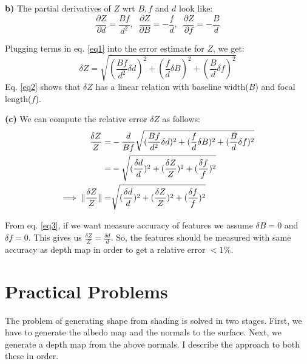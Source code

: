 \documentclass[11pt]{article}
\begin{document}
\textbf{b)} The partial derivatives of $Z$ wrt $B,f$ and $d$ look like:
\vspace{-10pt}
\begin{equation}
\frac{\partial Z}{\partial d} = \frac{Bf}{d^2},  \; \; \frac{\partial Z}{\partial B} = -\frac{f}{d}, \; \; \frac{\partial Z}{\partial f} = -\frac{B}{d} 
\label{eq1}
\end{equation}

Plugging terms in eq. \ref{eq1} into the error estimate for $Z$, we get:
\vspace{-5pt}
\begin{equation}
\delta Z = \sqrt{ (\frac{Bf}{d^2} \delta d)^2 + (\frac{f}{d} \delta B)^2 + (\frac{B}{d} \delta f)^2}
\label{eq2}
\end{equation}
\vspace{-5pt}
Eq. \ref{eq2} shows that $\delta Z$ has a linear relation with baseline width($B$) and focal length($f$).

\textbf{(c)} We can compute the relative error $\delta Z$ as follows:
\vspace{-10pt}
\begin{align}
\frac{\delta Z}{Z} =& -\frac{d}{Bf}  \sqrt{ (\frac{Bf}{d^2} \delta d)^2 + (\frac{f}{d} \delta B)^2 + (\frac{B}{d} \delta f)^2} \notag \\
=& -\sqrt{ (\frac{\delta d}{d})^2 + (\frac{\delta Z}{Z})^2  + (\frac{\delta f}{f})^2 } \notag \\
\implies \| \frac{\delta Z}{Z} \| =&  \sqrt{ (\frac{\delta d}{d})^2 + (\frac{\delta Z}{Z})^2  + (\frac{\delta f}{f})^2 } 
\label{eq3}
\end{align}

From eq. \ref{eq3}, if we want measure accuracy of features we assume $\delta B = 0$ and $\delta f = 0$. This gives us $\frac{\delta Z}{Z} = \frac{\delta d}{d} $. So, the features should be measured with same accuracy as depth map in order to get a relative error $< 1\%$.

\vspace{-10pt}
\section{Practical Problems}
 \vspace{-10pt}
 
 The problem of generating shape from shading is solved in two stages. First, we have to generate the albedo map and the normals to the surface. Next, we generate a depth map from the above normals. I describe the approach to both these in order.
 
\end{document}
